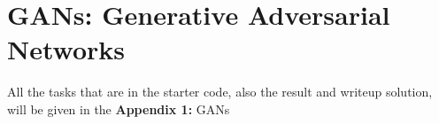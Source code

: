 \documentclass[a4paper, 10pt]{article}
\begin{document}
\subject[2110573 - Pattern Recognition]


\section{GANs: Generative Adversarial Networks}


All the tasks that are in the starter code, also the result and writeup solution,
will be given in the \textbf{Appendix 1:} GANs



\end{document}
